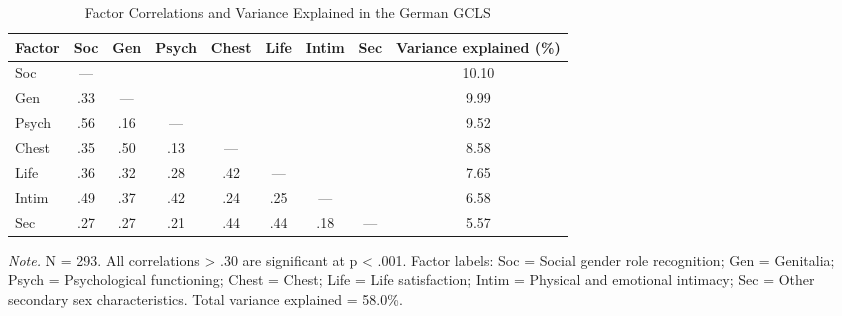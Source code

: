 \documentclass[12pt,a4paper]{article}
\begin{document}
\begin{table}[htbp]
\centering
\caption{Factor Correlations and Variance Explained in the German GCLS}
\begin{tabular}{lcccccccc}
\toprule
Factor & Soc & Gen & Psych & Chest & Life & Intim & Sec & Variance explained (\%)\\
\midrule
Soc & — & & & & & & & 10.10\\
Gen & .33 & — & & & & & & 9.99\\
Psych & .56 & .16 & — & & & & & 9.52\\
Chest & .35 & .50 & .13 & — & & & & 8.58\\
Life & .36 & .32 & .28 & .42 & — & & & 7.65\\
Intim & .49 & .37 & .42 & .24 & .25 & — & & 6.58\\
Sec & .27 & .27 & .21 & .44 & .44 & .18 & — & 5.57\\
\bottomrule
\end{tabular}
\begin{tablenotes}
\small
\item \textit{Note.} N = 293. All correlations > .30 are significant at p < .001. Factor labels: Soc = Social gender role recognition; Gen = Genitalia; Psych = Psychological functioning; Chest = Chest; Life = Life satisfaction; Intim = Physical and emotional intimacy; Sec = Other secondary sex characteristics. Total variance explained = 58.0\%.
\end{tablenotes}
\end{table}

\printbibliography
\end{document}
